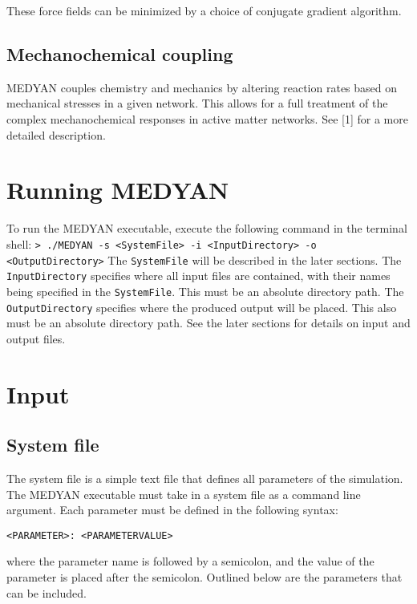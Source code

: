 \documentclass[11pt, oneside]{article}   	%
\begin{document}
\noindent These force fields can be minimized by a choice of conjugate gradient algorithm.

\subsection{Mechanochemical coupling} 

MEDYAN couples chemistry and mechanics by altering reaction rates based on mechanical stresses in a given 
network. This allows for a full treatment of the complex mechanochemical responses in active matter networks.
See [1] for a more detailed description.

\section{Running MEDYAN}

To run the MEDYAN executable, execute the following command in the terminal shell: \newline \newline\indent \texttt{> ./MEDYAN -s <SystemFile> -i <InputDirectory> -o <OutputDirectory>} \newline \newline The \texttt{SystemFile} will be described in the later sections. \newline\newline  The \texttt{InputDirectory} specifies where all input files are contained, with their names being specified in the \texttt{SystemFile}. This must be an absolute directory path. The \texttt{OutputDirectory} specifies where the produced output will be placed. This also must be an absolute directory path. See the later sections for details on input and output files.

\section {Input}

\subsection{System file}

The system file is a simple text file that defines all parameters of the simulation. The MEDYAN executable must take
 in a system file as a command line argument. \newline\newline Each parameter must be defined in the following syntax: \newline \newline \centerline{\texttt{<PARAMETER>:  <PARAMETERVALUE>}} \newline\newline where the parameter name is followed by a semicolon, and the value of the parameter is placed after the semicolon. Outlined below are the parameters that can be included. \\
 
\end{document}
